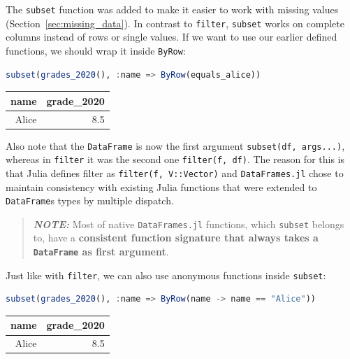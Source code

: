 \documentclass[
  notoc %
]{tufte-book}
\newcommand{\passthrough}[1]{#1}
\begin{document}
The \passthrough{\lstinline!subset!} function was added to make it
easier to work with missing values (Section~\ref{sec:missing_data}). In
contrast to \passthrough{\lstinline!filter!},
\passthrough{\lstinline!subset!} works on complete columns instead of
rows or single values. If we want to use our earlier defined functions,
we should wrap it inside \passthrough{\lstinline!ByRow!}:

\begin{lstlisting}[language=Julia]
subset(grades_2020(), :name => ByRow(equals_alice))
\end{lstlisting}

\begin{longtable}[]{@{}rr@{}}
\toprule
name & grade\_2020 \\
\midrule
\endhead
Alice & 8.5 \\
\bottomrule
\end{longtable}

Also note that the \passthrough{\lstinline!DataFrame!} is now the first
argument \passthrough{\lstinline!subset(df, args...)!}, whereas in
\passthrough{\lstinline!filter!} it was the second one
\passthrough{\lstinline!filter(f, df)!}. The reason for this is that
Julia defines filter as \passthrough{\lstinline!filter(f, V::Vector)!}
and \passthrough{\lstinline!DataFrames.jl!} chose to maintain
consistency with existing Julia functions that were extended to
\passthrough{\lstinline!DataFrame!}s types by multiple dispatch.

\begin{quote}
\textbf{\emph{NOTE:}} Most of native
\passthrough{\lstinline!DataFrames.jl!} functions, which
\passthrough{\lstinline!subset!} belongs to, have a \textbf{consistent
function signature that always takes a
\passthrough{\lstinline!DataFrame!} as first argument}.
\end{quote}

Just like with \passthrough{\lstinline!filter!}, we can also use
anonymous functions inside \passthrough{\lstinline!subset!}:

\begin{lstlisting}[language=Julia]
subset(grades_2020(), :name => ByRow(name -> name == "Alice"))
\end{lstlisting}

\begin{longtable}[]{@{}rr@{}}
\toprule
name & grade\_2020 \\
\midrule
\endhead
Alice & 8.5 \\
\bottomrule
\end{longtable}
\end{document}
